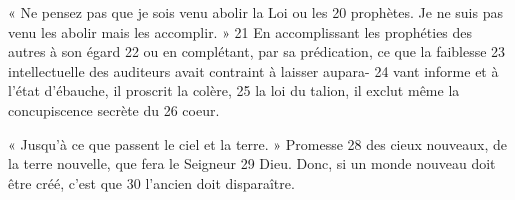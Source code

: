 « Ne pensez pas que je sois venu abolir la Loi ou les	 
20	 	prophètes. Je ne suis pas venu les abolir mais les accomplir. »	 
21	 	En accomplissant les prophéties des autres à son égard	 
22	 	ou en complétant, par sa prédication, ce que la faiblesse	 
23	 	intellectuelle des auditeurs avait contraint à laisser aupara-	 
24	 	vant informe et à l'état d'ébauche, il proscrit la colère,	 
25	 	la loi du talion, il exclut même la concupiscence secrète du	 
26	 	coeur.

« Jusqu'à ce que passent le ciel et la terre. » Promesse	 
28	 	des cieux nouveaux, de la terre nouvelle, que fera le Seigneur	 
29	 	Dieu. Donc, si un monde nouveau doit être créé, c'est que	 
30	 	l'ancien doit disparaître.